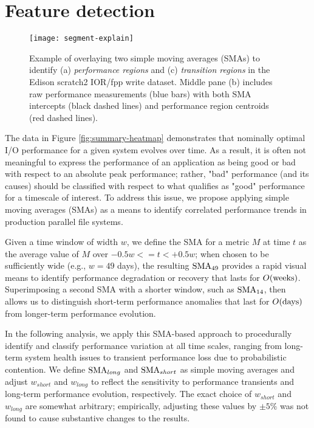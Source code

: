 \section{Feature detection}  \label{sec:features}

\begin{figure}[t]
    \centering
    \texttt{[image: segment-explain]}
    \vspace{-.35in}
    \caption{Example of overlaying two simple moving averages (SMAs) to identify (a) \emph{performance regions} and (c) \emph{transition regions} in the Edison scratch2 IOR/fpp write dataset.  Middle pane (b) includes raw performance measurements (blue bars) with both SMA intercepts (black dashed lines) and performance region centroids (red dashed lines).}
    \label{fig:segment-explain}
\end{figure}

The data in Figure \ref{fig:summary-heatmap} demonstrates that nominally optimal I/O performance for a given system evolves over time.
As a result, it is often not meaningful to express the performance of an application as being good or bad with respect to an absolute peak performance;
rather, "bad" performance (and its causes) should be classified with respect to what qualifies as "good" performance for a timescale of interest.
To address this issue, we propose applying simple moving averages (SMAs) as a means to identify correlated performance trends in production parallel file systems.

Given a time window of width $w$, we define the SMA for a metric $M$ at time $t$ as the average value of $M$ over ${-0.5w <= t < +0.5w}$;
when chosen to be sufficiently wide (e.g., $w = 49$ days), the resulting $\textup{SMA}_{49}$ provides a rapid visual means to identify performance degradation or recovery that lasts for $O(\textup{weeks})$.  Superimposing a second SMA with a shorter window, such as $\textup{SMA}_{14}$, then allows us to distinguish short-term performance anomalies that last for $O(\textup{days})$ from longer-term performance evolution.

In the following analysis, we apply this SMA-based approach to procedurally identify and classify performance variation at all time scales, ranging from long-term system health issues to transient performance loss due to probabilistic contention.
We define $\textup{SMA}_{long}$ and $\textup{SMA}_{short}$ as simple moving averages and adjust $w_{short}$ and $w_{long}$ to reflect the sensitivity to performance transients and long-term performance evolution, respectively.
The exact choice of $w_{short}$ and $w_{long}$ are somewhat arbitrary; empirically, adjusting these values by $\pm 5 \%$ was not found to cause substantive changes to the results.

